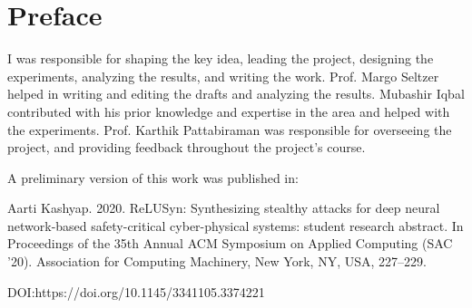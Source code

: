 
\chapter{Preface}

I was responsible for shaping the key idea, leading the project, designing the experiments, analyzing the results, and writing the work.
Prof. Margo Seltzer helped in writing and editing the drafts and analyzing the results. 
Mubashir Iqbal contributed with his prior knowledge and expertise in the area and helped with the experiments.
Prof. Karthik Pattabiraman was responsible for overseeing the project, and providing feedback throughout the project's course. 

A preliminary version of this work was published in:

Aarti Kashyap. 2020. ReLUSyn: Synthesizing stealthy attacks for deep neural network-based safety-critical cyber-physical systems: student research abstract. In Proceedings of the 35th Annual ACM Symposium on Applied Computing (SAC ’20). Association for Computing Machinery, New York, NY, USA, 227–229.

 DOI:https://doi.org/10.1145/3341105.3374221

